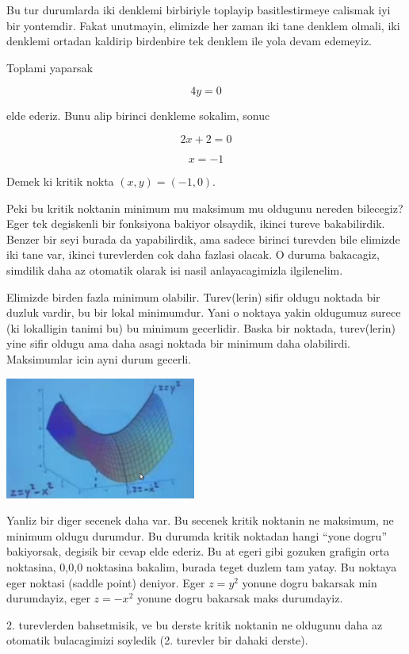 \documentclass[12pt,fleqn]{article}
\begin{document}
Bu tur durumlarda iki denklemi birbiriyle toplayip basitlestirmeye calismak
iyi bir yontemdir. Fakat unutmayin, elimizde her zaman iki tane denklem
olmali, iki denklemi ortadan kaldirip birdenbire tek denklem ile yola devam
edemeyiz. 

Toplami yaparsak

\[ 4y = 0 \]

elde ederiz. Bunu alip birinci denkleme sokalim, sonuc

\[ 2x + 2 = 0 \]

\[ x = -1 \]

Demek ki kritik nokta $(x,y) = (-1,0)$. 

Peki bu kritik noktanin minimum mu maksimum mu oldugunu nereden bilecegiz?
Eger tek degiskenli bir fonksiyona bakiyor olsaydik, ikinci tureve
bakabilirdik. Benzer bir seyi burada da yapabilirdik, ama sadece birinci
turevden bile elimizde iki tane var, ikinci turevlerden cok daha fazlasi
olacak. O duruma bakacagiz, simdilik daha az otomatik olarak isi nasil
anlayacagimizla ilgilenelim. 

Elimizde birden fazla minimum olabilir. Turev(lerin) sifir oldugu noktada
bir duzluk vardir, bu bir lokal minimumdur. Yani o noktaya yakin oldugumuz
surece (ki lokalligin tanimi bu) bu minimum gecerlidir. Baska bir noktada,
turev(lerin) yine sifir oldugu ama daha asagi noktada bir minimum daha
olabilirdi. Maksimumlar icin ayni durum gecerli.

\includegraphics[height=4cm]{9_4.png}

Yanliz bir diger secenek daha var. Bu secenek kritik noktanin ne maksimum,
ne minimum oldugu durumdur. Bu durumda kritik noktadan hangi ``yone dogru''
bakiyorsak, degisik bir cevap elde ederiz. Bu at egeri gibi gozuken
grafigin orta noktasina, 0,0,0 noktasina bakalim, burada teget duzlem tam
yatay. Bu noktaya eger noktasi (saddle point) deniyor. Eger $z=y^2$ yonune
dogru bakarsak min durumdayiz, eger $z=-x^2$ yonune dogru bakarsak maks
durumdayiz. 

2. turevlerden bahsetmisik, ve bu derste kritik noktanin ne oldugunu daha
az otomatik bulacagimizi soyledik (2. turevler bir dahaki derste). 
\end{document}
